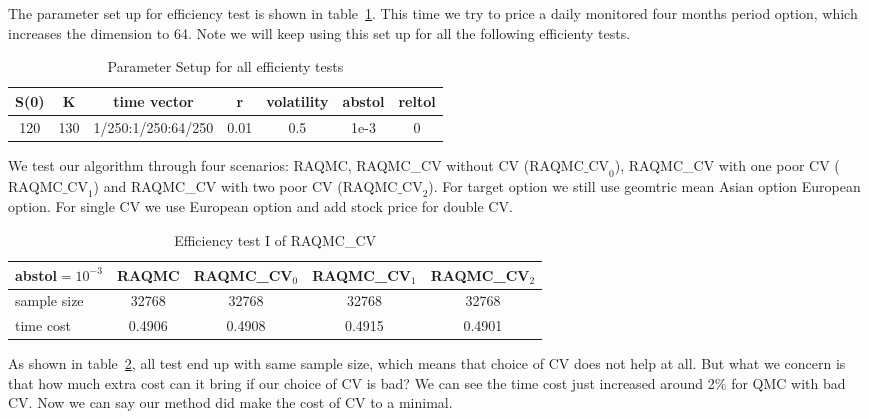 The parameter set up for efficiency test is shown in table~\ref{tb:effsetup}. 
This time we try to price a daily monitored four months period option, which increases the dimension to 64. 
Note we will keep using this set up for all the following efficienty tests. 
\begin{table}[h]
    \centering
	\caption{Parameter Setup for all efficienty tests}
    \label{tb:effsetup}
	\begin{tabular}{ccccccc}
		\hline\hline
        S(0) & K & time vector & r & volatility & abstol & reltol \\[0.5ex]
        \hline
        120  & 130 & 1/250:1/250:64/250 & 0.01 & 0.5 & 1e-3 & 0\\[1ex] 
        \hline
	\end{tabular}
\end{table}
We test our algorithm through four scenarios: RAQMC, RAQMC\_CV without CV ($\textrm{RAQMC\_CV}_0$), 
RAQMC\_CV with one poor CV ($\textrm{RAQMC\_CV}_1$) and RAQMC\_CV with two poor CV ($\textrm{RAQMC\_CV}_2$). 
For target option we still use geomtric mean Asian option European option. For single CV we use European option and add stock price for double CV. 
\begin{table}[h]
    \centering
	\caption{Efficiency test I of RAQMC\_CV}
    \label{tb:efftest1}
    \begin{tabular}{lcccc}  
    \hline\hline
    abstol$=10^{-3}$&RAQMC&RAQMC\_CV$_0$&RAQMC\_CV$_1$& RAQMC\_CV$_2$\\[0.5ex]
    \hline
    sample size	&32768&32768&32768&32768\\[1ex]
    time cost &0.4906&0.4908 &0.4915 &0.4901\\[1ex]
   \hline
	\end{tabular}
\end{table}
As shown in table~\ref{tb:efftest1}, all test end up with same sample size, which means that choice of CV does not help at all. 
But what we concern is that how much extra cost can it bring if our choice of CV is bad? We can see the time cost just increased around 2\% for QMC with bad CV. Now we can say our method did make the cost of CV to a minimal.  

